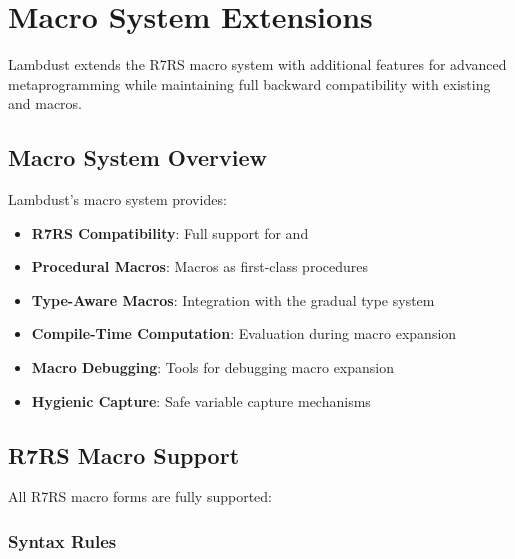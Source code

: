 \chapter{Macro System Extensions}
\label{ch:macros}

Lambdust extends the R7RS macro system with additional features for advanced metaprogramming while maintaining full backward compatibility with existing  and  macros.

\section{Macro System Overview}
\label{sec:macro-overview}

Lambdust's macro system provides:

\begin{itemize}
\item \textbf{R7RS Compatibility}: Full support for  and 
\item \textbf{Procedural Macros}: Macros as first-class procedures
\item \textbf{Type-Aware Macros}: Integration with the gradual type system
\item \textbf{Compile-Time Computation}: Evaluation during macro expansion
\item \textbf{Macro Debugging}: Tools for debugging macro expansion
\item \textbf{Hygienic Capture}: Safe variable capture mechanisms
\end{itemize}

\section{R7RS Macro Support}
\label{sec:r7rs-macros}


All R7RS macro forms are fully supported:

\subsection{Syntax Rules}
\label{subsec:syntax-rules}

